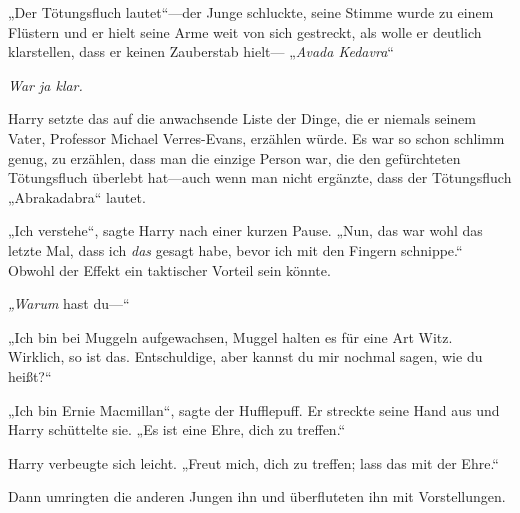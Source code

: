 „Der Tötungsfluch lautet“—der Junge schluckte, seine Stimme wurde zu einem Flüstern und er hielt seine Arme weit von sich gestreckt, als wolle er deutlich klarstellen, dass er keinen Zauberstab hielt— „\emph{Avada Kedavra}“

\emph{War ja klar.}

Harry setzte das auf die anwachsende Liste der Dinge, die er niemals seinem Vater, Professor Michael Verres-Evans, erzählen würde. Es war so schon schlimm genug, zu erzählen, dass man die einzige Person war, die den gefürchteten Tötungsfluch überlebt hat—auch wenn man nicht ergänzte, dass der Tötungsfluch „Abrakadabra“ lautet.

„Ich verstehe“, sagte Harry nach einer kurzen Pause. „Nun, das war wohl das letzte Mal, dass ich \emph{das} gesagt habe, bevor ich mit den Fingern schnippe.“ Obwohl der Effekt ein taktischer Vorteil sein könnte.

\emph{„Warum} hast du—“

„Ich bin bei Muggeln aufgewachsen, Muggel halten es für eine Art Witz. Wirklich, so ist das. Entschuldige, aber kannst du mir nochmal sagen, wie du heißt?“

„Ich bin Ernie Macmillan“, sagte der Hufflepuff. Er streckte seine Hand aus und Harry schüttelte sie. „Es ist eine Ehre, dich zu treffen.“

Harry verbeugte sich leicht. „Freut mich, dich zu treffen; lass das mit der Ehre.“

Dann umringten die anderen Jungen ihn und überfluteten ihn mit Vorstellungen.

